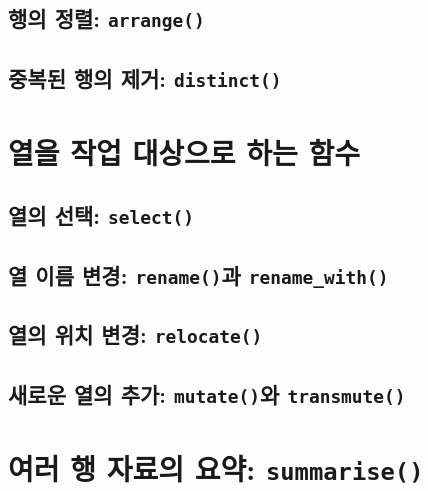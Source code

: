 \documentclass[
]{book}
\begin{document}
\hypertarget{uxd589uxc758-uxc815uxb82c-arrange}{%
\subsection{\texorpdfstring{행의 정렬: \texttt{arrange()}}{행의 정렬: arrange()}}\label{uxd589uxc758-uxc815uxb82c-arrange}}

\hypertarget{uxc911uxbcf5uxb41c-uxd589uxc758-uxc81cuxac70-distinct}{%
\subsection{\texorpdfstring{중복된 행의 제거: \texttt{distinct()}}{중복된 행의 제거: distinct()}}\label{uxc911uxbcf5uxb41c-uxd589uxc758-uxc81cuxac70-distinct}}

\hypertarget{uxc5f4uxc744-uxc791uxc5c5-uxb300uxc0c1uxc73cuxb85c-uxd558uxb294-uxd568uxc218}{%
\section{열을 작업 대상으로 하는 함수}\label{uxc5f4uxc744-uxc791uxc5c5-uxb300uxc0c1uxc73cuxb85c-uxd558uxb294-uxd568uxc218}}

\hypertarget{uxc5f4uxc758-uxc120uxd0dd-select}{%
\subsection{\texorpdfstring{열의 선택: \texttt{select()}}{열의 선택: select()}}\label{uxc5f4uxc758-uxc120uxd0dd-select}}

\hypertarget{uxc5f4-uxc774uxb984-uxbcc0uxacbd-renameuxacfc-rename_with}{%
\subsection{\texorpdfstring{열 이름 변경: \texttt{rename()}과 \texttt{rename\_with()}}{열 이름 변경: rename()과 rename\_with()}}\label{uxc5f4-uxc774uxb984-uxbcc0uxacbd-renameuxacfc-rename_with}}

\hypertarget{uxc5f4uxc758-uxc704uxce58-uxbcc0uxacbd-relocate}{%
\subsection{\texorpdfstring{열의 위치 변경: \texttt{relocate()}}{열의 위치 변경: relocate()}}\label{uxc5f4uxc758-uxc704uxce58-uxbcc0uxacbd-relocate}}

\hypertarget{uxc0c8uxb85cuxc6b4-uxc5f4uxc758-uxcd94uxac00-mutateuxc640-transmute}{%
\subsection{\texorpdfstring{새로운 열의 추가: \texttt{mutate()}와 \texttt{transmute()}}{새로운 열의 추가: mutate()와 transmute()}}\label{uxc0c8uxb85cuxc6b4-uxc5f4uxc758-uxcd94uxac00-mutateuxc640-transmute}}

\hypertarget{uxc5ecuxb7ec-uxd589-uxc790uxb8ccuxc758-uxc694uxc57d-summarise}{%
\section{\texorpdfstring{여러 행 자료의 요약: \texttt{summarise()}}{여러 행 자료의 요약: summarise()}}\label{uxc5ecuxb7ec-uxd589-uxc790uxb8ccuxc758-uxc694uxc57d-summarise}}

  
\end{document}
